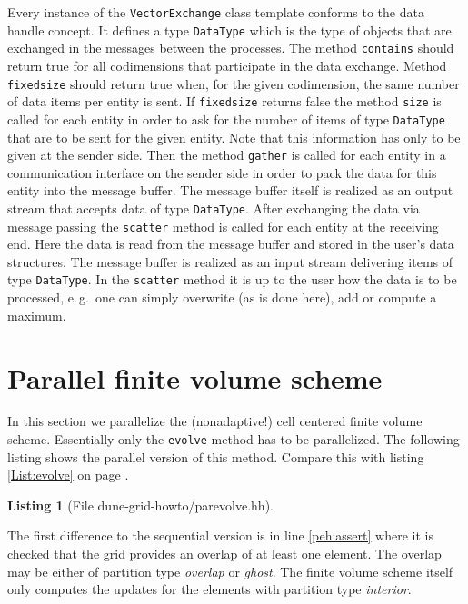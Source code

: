 \documentclass[11pt,a4paper,headinclude,footinclude,DIV16,normalheadings]{scrreprt}
\newtheorem{lst}{Listing}
\begin{document}
Every instance of the \lstinline!VectorExchange! class template
conforms to the data handle concept. It defines a type
\lstinline!DataType! which is the type of objects that are exchanged
in the messages between the processes. The method \lstinline!contains!
should return true for all codimensions that participate in the data
exchange. Method \lstinline!fixedsize! should return true when, for
the given codimension, the same number of data items per entity is
sent. If \lstinline!fixedsize! returns false the method
\lstinline!size! is called for each entity in order to ask 
for the number of items of type \lstinline!DataType! that are to be
sent for the given entity. Note that this information has only to be
given at the sender side. Then the method \lstinline!gather! is called
for each entity in a communication interface on the sender side in
order to pack the data for this entity into the message buffer. The
message buffer itself is realized as an output stream that accepts data
of type \lstinline!DataType!. After exchanging the data via message
passing the \lstinline!scatter! method is called for each entity at
the receiving end. Here the data is read from the message buffer and
stored in the user's data structures. The message buffer is realized
as an input stream delivering items of type \lstinline!DataType!. In
the \lstinline!scatter! method it is up to the user how the data is to
be processed, e.\,g.~one can simply overwrite (as is done here), add or
compute a maximum.

\section{Parallel finite volume scheme}

In this section we parallelize the (nonadaptive!) cell centered finite volume
scheme. Essentially only the \lstinline!evolve! method has to be
parallelized. The following listing shows the parallel version of this
method. Compare this with listing \ref{List:evolve} on page \pageref{List:evolve}.

\begin{lst}[File dune-grid-howto/parevolve.hh] \mbox{}
\nopagebreak

\end{lst}

The first difference to the sequential version is in line
\ref{peh:assert} where it is checked that the grid provides an overlap
of at least one element. The overlap may be either of partition type
\textit{overlap} or \textit{ghost}. The finite volume scheme itself
only computes the updates for the elements with partition type
\textit{interior}.
\end{document}
